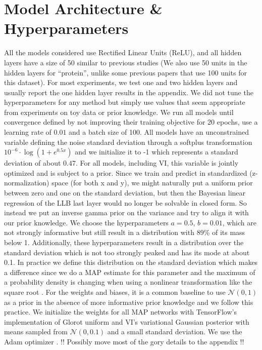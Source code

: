 \documentclass[../thesis.tex]{subfiles}
\begin{document}
\section{Model Architecture \& Hyperparameters}
All the models considered use Rectified Linear Units (ReLU), and all hidden layers have a size of 50 similar to previous studies (We also use 50 units in the hidden layers for ``protein'', unlike some previous papers that use 100 units for this dataset). For most experiments, we test one and two hidden layers and usually report the one hidden layer results in the appendix. We did not tune the hyperparameters for any method but simply use values that seem appropriate from experiments on toy data or prior knowledge. We run all models until convergence defined by not improving their training objective for 20 epochs, use a learning rate of $0.01$ and a batch size of 100. All models have an unconstrained variable defining the noise standard deviation through a softplus transformation $10^{-6} \cdot \log(1 + e^{0.5x})$ and we initialize it to -1 which represents a standard deviation of about $0.47$. For all models, including VI, this variable is jointly optimized and is subject to a prior. Since we train and predict in standardized (z-normalization) space (for both x and y), we might naturally put a uniform prior between zero and one on the standard deviation, but then the Bayesian linear regression of the LLB last layer would no longer be solvable in closed form. So instead we put an inverse gamma prior on the variance and try to align it with our prior knowledge. We choose the hyperparameters $a=0.5$, $b=0.01$, which are not strongly informative but still result in a distribution with 89\% of its mass below 1. Additionally, these hyperparameters result in a distribution over the standard deviation which is not too strongly peaked and has its mode at about 0.1. In practice we define this distribution on the standard deviation which makes a difference since we do a MAP estimate for this parameter and the maximum of a probability density is changing when using a nonlinear transformation like the square root \parencite[Chapter~1.2.1]{bishop2006pattern}. For the weights and biases, it is a common baseline to use $\mathcal{N}(0, 1)$ as a prior in the absence of more informative prior knowledge and we follow this practice. We initialize the weights for all MAP networks with TensorFlow's implementation of Glorot uniform \parencite{glorot2010understanding} and VI's variational Gaussian posterior with means sampled from $\mathcal{N}(0, 0.1)$ and a small standard deviation. We use the Adam optimizer \parencite{kingma2014adam}.
!! Possibly move most of the gory details to the appendix !!
\end{document}
